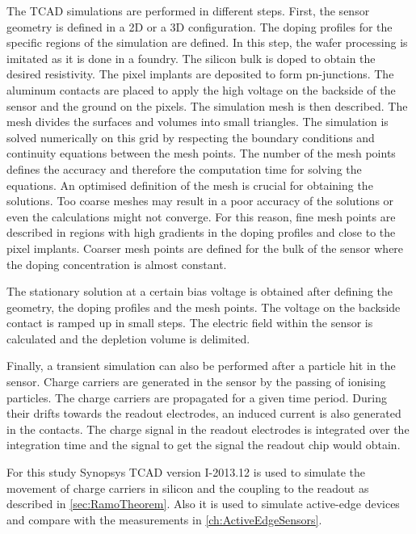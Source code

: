 The TCAD simulations are performed in different steps. First, the
sensor geometry is defined in a 2D or a 3D configuration. The doping
profiles for the specific regions of the simulation are defined. In
this step, the wafer processing is imitated as it is done in a
foundry. The silicon bulk is doped to obtain the desired
resistivity. The pixel implants are deposited to form
pn-junctions. The aluminum contacts are placed to apply the high
voltage on the backside of the sensor and the ground on the
pixels. The simulation mesh is then described. The mesh divides the
surfaces and volumes into small triangles. The simulation is solved
numerically on this grid by respecting the boundary conditions and
continuity equations between the mesh points. The number of the mesh
points defines the accuracy and therefore the computation time for
solving the equations. An optimised definition of the mesh is crucial
for obtaining the solutions. Too coarse meshes may result in a poor
accuracy of the solutions or even the calculations might not
converge. For this reason, fine mesh points are described in regions
with high gradients in the doping profiles and close to the pixel
implants. Coarser mesh points are defined for the bulk of the sensor
where the doping concentration is almost constant.

The stationary solution at a certain bias voltage is obtained after
defining the geometry, the doping profiles and the mesh points. The
voltage on the backside contact is ramped up in small steps. The
electric field within the sensor is calculated and the depletion
volume is delimited.

Finally, a transient simulation can also be performed after a particle
hit in the sensor. Charge carriers are generated in the sensor by the
passing of ionising particles. The charge carriers are propagated for
a given time period. During their drifts towards the readout
electrodes, an induced current is also generated in the contacts. The
charge signal in the readout electrodes is integrated over the
integration time and the signal to get the signal the readout chip
would obtain.

For this study Synopsys TCAD version I-2013.12 is used to simulate the
movement of charge carriers in silicon and the coupling to the readout
as described in \cref{sec:RamoTheorem}. Also it is used to simulate
active-edge devices and compare with the measurements in
\cref{ch:ActiveEdgeSensors}.

